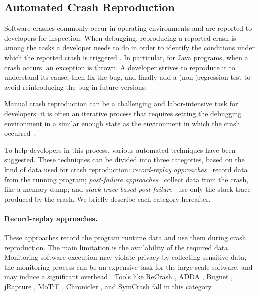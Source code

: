
\subsection{Automated Crash Reproduction}
Software crashes commonly occur in operating environments and are reported to developers for inspection.
When debugging, reproducing a reported crash is among the tasks a developer needs to do in order to identify the conditions under which the reported crash is triggered \cite{Zeller2009, BellerICSE2018}.
In particular, for Java programs, when a crash occurs, an exception is thrown. A developer strives to reproduce it to understand its cause, then fix the bug, and finally add a (non-)regression test to avoid reintroducing the bug in future versions. 

Manual crash reproduction can be a challenging and labor-intensive task for developers: it is often an iterative process that requires setting the debugging environment in a similar enough state as the environment in which the crash occurred~\cite{Zeller2009}.

To help developers in this process, various automated techniques have been suggested.
These techniques can be divided into three categories, based on the kind of data used for crash reproduction: \emph{record-replay approaches}~\cite{Artzi2008, Clause2007, Narayanasamy2005, Steven2000, Gomez2016, Bell2013, Cao2014} record data from the running program; \emph{post-failure approaches}~\cite{Rossler2013, YZW17descry,Weeratunge2010, Leitner2007, Leitner2009, Kifetew2013, Kifetew2014} collect data from the crash, like a memory dump; and \emph{stack-trace based post-failure}~\cite{BPT17concrash,soltani2017,Nayrolles2017,Xuan2015,Chen2015} use only the stack trace produced by the crash. We briefly describe each category hereafter.

\paragraph{Record-replay approaches.}

These approaches record the program runtime data and use them during crash reproduction. The main limitation is the availability of the required data. Monitoring software execution may violate privacy by collecting sensitive data, the monitoring process can be an expensive task for the large scale software, and may induce a significant overhead \cite{Chen2015, Nayrolles2017, Rossler2013}.
%
Tools like \textrm{ReCrash} \cite{Artzi2008}, \textrm{ADDA} \cite{Clause2007}, \textrm{Bugnet} \cite{Narayanasamy2005}, \textrm{jRapture} \cite{Steven2000}, \textrm{MoTiF} \cite{Gomez2016}, \textrm{Chronicler} \cite{Bell2013}, and \textrm{SymCrash} \cite{Cao2014} fall in this category.


